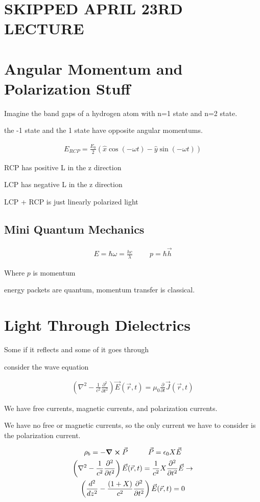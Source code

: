 \documentclass[fleqn]{report}
\newcommand{\hp}{\hspace{1cm}}
\newcommand{\del}{\partial}
\newcommand{\equations} [1] {
\begin{gather*}
#1
\end{gather*}
}
\begin{document}
\section{SKIPPED APRIL 23RD LECTURE}

\section{Angular Momentum and Polarization Stuff}
Imagine the band gaps of a hydrogen atom with n=1 state and n=2 state. 

the -1 state and the 1 state have opposite angular momentums. 

\equations{
    E_{RCP} 
    =
    \frac{E_0}{2}
    \left(
        \hat x 
        \cos(-\omega t)
        -
        \hat y
        \sin(-\omega t)
    \right)
}

RCP has positive L in the z direction 

LCP has negative L in the z direction 

LCP  + RCP is just linearly polarized light

\subsection{Mini Quantum Mechanics}
\equations{
    E = \hbar \omega = \frac{h c}{\lambda}
    \hp 
    p 
    =
    \hbar \vec h
}
Where $p$ is momentum 

energy packets are quantum, momentum transfer is classical. 

\section{Light Through Dielectrics}
Some if it reflects and some of it goes through 

consider the wave equation 
\equations{
    \left(
        \nabla^2 
        -
        \frac{1}{c^2}
        \frac{\del^2}{\del t^2}
    \right)
    \vec E(\vec r, t)
    =
    \mu_0 \frac{\del}{\del t} \vec J(\vec r, t)
}

We have free currents, magnetic currents, and polarization currents. 

We have no free or magnetic currents, so the only current we have to 
consider is the polarization current. 

\equations{
    \rho_b 
    =
    - \curl \vec P 
    \hp 
    \vec P 
    =
    \epsilon_0 X \vec E 
    \\
    \left(
        \nabla^2 
        -
        \frac{1}{c^2}
        \frac{\del^2}{\del t^2}
    \right)
    \vec E(\vec r, t)
    =
    \frac{1}{c^2}
    X 
    \frac{\del^2}{\del t^2}
    \vec E 
    \rightarrow 
    \\
    \left(
        \frac{d^2}{d z^2}
        -
        \frac{(1 + X)}{c^2}
        \frac{\del^2}{\del t^2}
    \right)
    \vec E(\vec r, t)
    =
    0
}
\end{document}
